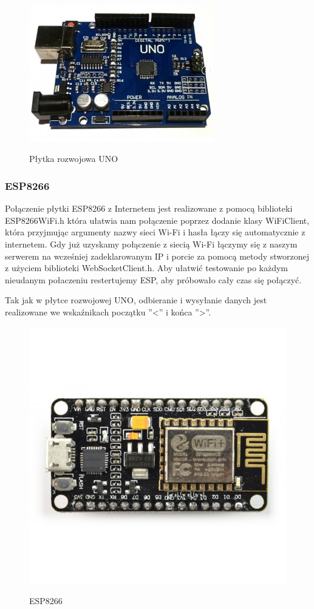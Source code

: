 \documentclass[12pt]{article}
\begin{document}
\begin{figure}[!h]
	\begin{center}
		{\includegraphics[width=8cm]{uno_photo.png}}
	\end{center}
	\caption{Płytka rozwojowa UNO}
\end{figure}

\newpage
\subsubsection{ESP8266}
Połączenie płytki ESP8266 z Internetem jest realizowane z pomocą biblioteki ESP8266WiFi.h która ułatwia nam połączenie poprzez dodanie klasy WiFiClient, która przyjmując argumenty nazwy sieci Wi-Fi i hasła łączy się automatycznie z internetem.
Gdy już uzyskamy połączenie z siecią Wi-Fi łączymy się z naszym serwerem na wcześniej zadeklarowanym IP i porcie za pomocą metody stworzonej z użyciem biblioteki WebSocketClient.h.
Aby ułatwić testowanie po każdym nieudanym połaczeniu restertujemy ESP, aby próbowało cały czas się połączyć.

Tak jak w płytce rozwojowej UNO, odbieranie i wysyłanie danych jest realizowane we wskaźnikach początku ''<'' i końca ''>''.
\begin{figure}[!h]
	\begin{center}
		{\includegraphics[width=12cm]{esp8266_photo.png}}
	\end{center}
	\caption{ESP8266}
\end{figure}
\end{document}
